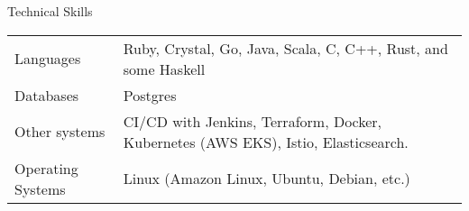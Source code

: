 \documentclass{resume} %
\begin{document}
\begin{rSection}{Technical Skills}
	\begin{table}[h]
		\centering
		\begin{tabular}{ l l }
			Languages & Ruby, Crystal, Go, Java, Scala, C, C++, Rust, and some Haskell \\
			Databases & Postgres \\
			Other systems & CI/CD with Jenkins, Terraform, Docker, Kubernetes (AWS EKS), Istio, Elasticsearch. \\
			Operating Systems & Linux (Amazon Linux, Ubuntu, Debian, etc.) \\
		\end{tabular}
	\end{table}
\end{rSection}

\end{document}
